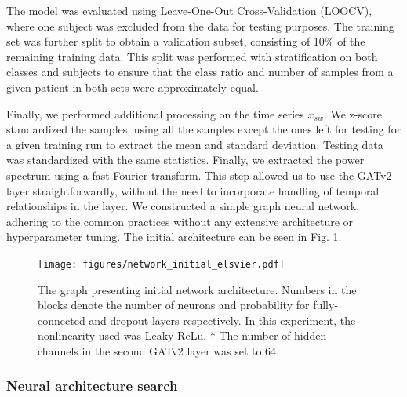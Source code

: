 \documentclass[a4paper,fleqn]{cas-sc}
\begin{document}
The model was evaluated using Leave-One-Out Cross-Validation (LOOCV), where one subject was excluded from the data for testing purposes. The training set was further split to obtain a validation subset, consisting of 10\% of the remaining training data. This split was performed with stratification on both classes and subjects to ensure that the class ratio and number of samples from a given patient in both sets were approximately equal.

Finally, we performed additional processing on the time series $x_{sw}$. We z-score standardized the samples, using all the samples except the ones left for testing for a given training run to extract the mean and standard deviation. Testing data was standardized with the same statistics. Finally, we extracted the power spectrum using a fast Fourier transform. This step allowed us to use the GATv2 layer straightforwardly, without the need to incorporate handling of temporal relationships in the layer.
We constructed a simple graph neural network, adhering to the common practices without any extensive architecture or hyperparameter tuning. The initial architecture can be seen in Fig. \ref{fig:initial-network}.

\begin{figure}[h]
    \centering
    \texttt{[image: figures/network\_initial\_elsvier.pdf]}
    \caption{The graph presenting initial network architecture. Numbers in the blocks denote the number of neurons and probability for fully-connected and dropout layers respectively. In this experiment, the nonlinearity used was Leaky ReLu. \newline
    * The number of hidden channels in the second GATv2 layer was set to 64. 
    }
    \label{fig:initial-network}
\end{figure}

\subsubsection{Neural architecture search}
\end{document}
